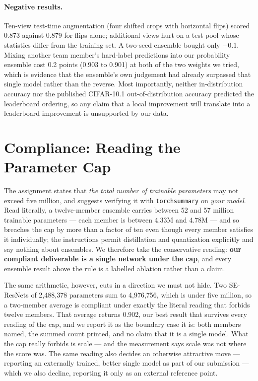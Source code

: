 \documentclass[letterpaper]{article} %
\begin{document}
\paragraph{Negative results.} Ten-view test-time augmentation (four shifted crops with
horizontal flips) scored 0.873 against 0.879 for flips alone; additional views hurt on a test
pool whose statistics differ from the training set. A two-seed ensemble bought only +0.1.
Mixing another team member's hard-label predictions into our probability ensemble cost 0.2
points (0.903 to 0.901) at both of the two weights we tried, which is evidence that the
ensemble's own judgement had already surpassed that single model rather than the reverse. Most
importantly, neither in-distribution accuracy nor the published CIFAR-10.1 out-of-distribution
accuracy predicted the leaderboard ordering, so any claim that a local improvement will
translate into a leaderboard improvement is unsupported by our data.

\section{Compliance: Reading the Parameter Cap}
\label{sec:compliance}

The assignment states that \emph{the total number of trainable parameters} may not exceed five
million, and suggests verifying it with \texttt{torchsummary} on \emph{your model}. Read
literally, a twelve-member ensemble carries between 52 and 57 million trainable parameters ---
each member is between 4.33M and 4.78M --- and so breaches the cap by more than a factor of ten
even though every member satisfies it individually; the
instructions permit distillation and quantization explicitly and say nothing about ensembles.
We therefore take the conservative reading: \textbf{our compliant deliverable is a single
network under the cap}, and every ensemble result above the rule is a labelled ablation rather
than a claim.

The same arithmetic, however, cuts in a direction we must not hide. Two SE-ResNets of
2{,}488{,}378 parameters sum to 4{,}976{,}756, which is under five million, so a two-member
average is compliant under exactly the literal reading that forbids twelve members. That average
returns 0.902, our best result that survives every reading of the cap, and we report it as the
boundary case it is: both members named, the summed count printed, and no claim that it is a
single model. What the cap really forbids is scale --- and the measurement says scale was not
where the score was. The same reading also decides an otherwise attractive move --- reporting an externally
trained, better single model as part of our submission --- which we also decline, reporting it
only as an external reference point.
\end{document}

